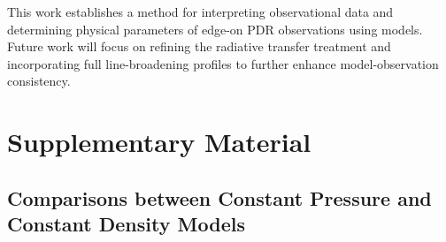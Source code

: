 \documentclass[12pt,a4paper]{article}
\begin{document}
This work establishes a method for interpreting observational data and determining physical parameters of edge-on PDR observations using models. Future work will focus on refining the radiative transfer treatment and incorporating full line-broadening profiles to further enhance model-observation consistency.

\clearpage
{}
\printbibliography

\clearpage
\appendix
\section*{Supplementary Material}

\subsection*{Comparisons between Constant Pressure and Constant Density Models}
\end{document}

